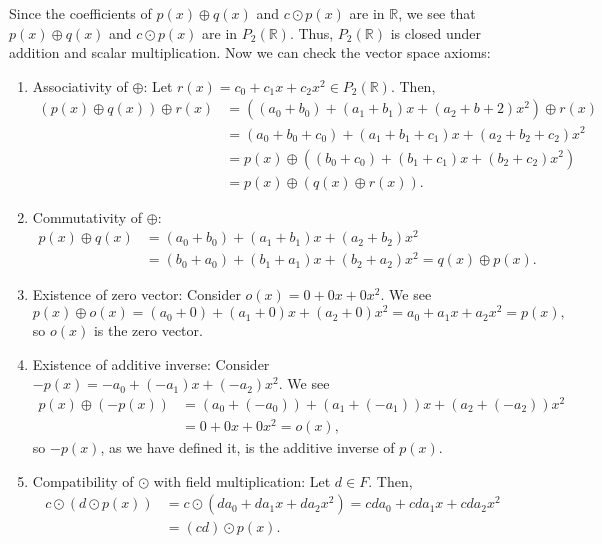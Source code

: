 \begin{sltn}
Since the coefficients of $ p(x)\oplus q(x) $ and $ c\odot p(x) $ are in $ \mathbb{R} $, we see that $ p(x)\oplus q(x) $ and $ c\odot p(x) $ are in $ P_2(\mathbb{R}) $. Thus, $ P_2(\mathbb{R}) $ is closed under addition and scalar multiplication. Now we can check the vector space axioms:
\begin{enumerate}
    \item Associativity of $ \oplus $: Let $ r(x)=c_0+c_1x+c_2x^2\in P_2(\mathbb{R}) $. Then,
    \begin{align*}
        (p(x)\oplus q(x))\oplus r(x) &= ((a_0+b_0)+(a_1+b_1)x+(a_2+b+2)x^2)\oplus r(x) \\
        &= (a_0+b_0+c_0)+(a_1+b_1+c_1)x+(a_2+b_2+c_2)x^2 \\
        &= p(x)\oplus((b_0+c_0)+(b_1+c_1)x+(b_2+c_2)x^2) \\
        &= p(x)\oplus(q(x)\oplus r(x)).
    \end{align*}

    \item Commutativity of $ \oplus $:
    \begin{align*}
        p(x)\oplus q(x) &= (a_0+b_0)+(a_1+b_1)x+(a_2+b_2)x^2 \\
        &= (b_0+a_0)+(b_1+a_1)x+(b_2+a_2)x^2=q(x)\oplus p(x).
    \end{align*}

    \item Existence of zero vector: Consider $ o(x)=0+0x+0x^2 $. We see
    \begin{equation*}
        p(x)\oplus o(x)=(a_0+0)+(a_1+0)x+(a_2+0)x^2=a_0+a_1x+a_2x^2=p(x),
    \end{equation*}
    so $ o(x) $ is the zero vector.

    \item Existence of additive inverse: Consider $ -p(x)=-a_0+(-a_1)x+(-a_2)x^2 $. We see
    \begin{align*}
        p(x)\oplus(-p(x)) &= (a_0+(-a_0))+(a_1+(-a_1))x+(a_2+(-a_2))x^2 \\
        &= 0+0x+0x^2=o(x),
    \end{align*}
    so $ -p(x) $, as we have defined it, is the additive inverse of $ p(x) $.

    \item Compatibility of $ \odot $ with field multiplication: Let $ d\in F $. Then,
    \begin{align*}
        c\odot(d\odot p(x)) &= c\odot(da_0+da_1x+da_2x^2)=cda_0+cda_1x+cda_2x^2 \\
        &= (cd)\odot p(x).
    \end{align*}


\end{enumerate}
\end{sltn}
